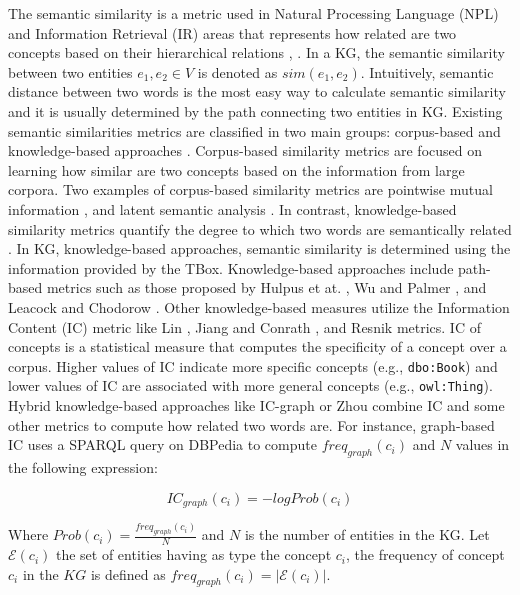 \documentclass{ieeeaccess}
\begin{document}
The semantic similarity is a metric used in Natural 
Processing Language (NPL) and Information Retrieval
(IR) areas \cite{HOVY20132} that represents how related 
are two concepts based on their hierarchical relations 
\cite{resnik1995using}, \cite{turney2010frequency}. 
In a KG, the semantic similarity between two 
entities $e_{1}, e_{2} \in V$ is denoted as $sim(e_{1}, e_{2})$. 
Intuitively, semantic distance between two words is the
most easy way to calculate semantic similarity and it is usually
determined by the path connecting two entities in KG. Existing
semantic similarities metrics are classified in two main 
groups: corpus-based and knowledge-based approaches 
\cite{mihalcea2006corpus}. Corpus-based 
similarity metrics are focused on learning how similar
are two concepts based on the information from large corpora.
Two examples of corpus-based similarity metrics are pointwise 
mutual information \cite{church1990word}, and latent semantic
analysis \cite{landauer1997solution}. In contrast, knowledge-based
similarity metrics quantify the degree to which two words are 
semantically related \cite{budanitsky2001semantic}. In KG, 
knowledge-based approaches, semantic similarity is determined
using the information provided by the TBox. Knowledge-based
approaches include path-based metrics such as those proposed 
by Hulpus et at. \cite{hulpucs2015path}, Wu and Palmer
\cite{wu1994verb}, and Leacock and Chodorow 
\cite{leacock1998combining}. Other knowledge-based measures
utilize the Information Content (IC) metric like Lin 
\cite{lin1998information}, Jiang and Conrath 
\cite{jiang1997semantic}, and Resnik \cite{resnik1995using}
metrics. IC of concepts is a statistical measure that computes
the specificity of a concept over a corpus. Higher 
values of IC indicate more specific concepts (e.g.,
\texttt{dbo:Book}) and lower values of IC are associated
with more general concepts (e.g., \texttt{owl:Thing}).
Hybrid knowledge-based approaches like IC-graph 
\cite{ZhuIglesias2017} or Zhou \cite{zhou2008new} combine
IC and some other metrics to compute how related two words
are. For instance, graph-based IC \cite{ZhuIglesias2017} 
uses a SPARQL query on DBPedia to compute $freq_{graph}(c_{i})$
and $N$ values in the following expression:

\begin{equation}
    \label{eq:ic_graph}
    IC_{graph}(c_{i}) = -logProb(c_{i})
\end{equation}

Where $Prob(c_{i}) = \frac{freq_{graph}(c_{i})}{N}$ and $N$ is the 
number of entities in the KG. Let $\mathcal{E}(c_{i})$ the set of 
entities having as type the concept $c_{i}$, the frequency of
concept $c_{i}$ in the $KG$ is defined as 
$freq_{graph}(c_{i}) = |\mathcal{E}(c_{i})|$.
\end{document}
